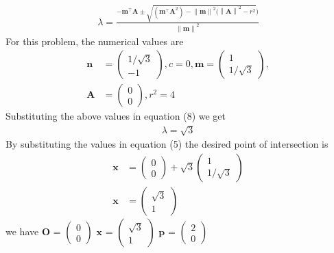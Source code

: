 \documentclass[10pt,a4paper]{report}
\providecommand{\norm}[1]{\left\lVert#1\right\rVert}
\newcommand{\myvec}[1]{\ensuremath{\begin{pmatrix}#1\end{pmatrix}}}
\let\vec\mathbf
\begin{document}
\begin{multicols}{2}
	  \begin{align}                                                                                      
		  \lambda = \frac{-\vec{m}^{\top}\vec{A}\pm \sqrt{({\vec{m}^{\top}\vec{A}}^2) -\norm{\vec{m}}^2({\norm{\vec{A}}}^2 - r^2 })}{\norm{\vec{m}}^2}                                                  
	  \end{align}                                                                                     
	  For this problem, the numerical values are                                                  
	  \begin{align}              
		  \vec{n} &= \myvec{1/\sqrt{3} \\ -1}, c = 0,
		  \vec{m} = \myvec{1 \\ 1/\sqrt{3}},                                      \\
                            \vec{A} &= \myvec{0 \\ 0},  r^2 = 4                                             
	  \end{align}                                                                                 
	  Substituting the above values in equation (8) we get                                                        
	  \begin{align}                                                                               
		  \lambda = \sqrt{3}
	  \end{align}
	  By substituting the values in equation (5)
the desired point of intersection is                                               
\begin{align}
	\vec{x} &= \myvec{0\\ 0} + \sqrt{3} \myvec{1 \\ 1/\sqrt{3}}        \\                        
	\vec{x} &= \myvec{\sqrt{3} \\ 1}                               
\end{align}
we have $\vec O$ = $\begin{pmatrix} 0 \\ 0 \end{pmatrix}$ 
	$\vec x$ = $\begin{pmatrix} \sqrt{3} \\ 1 \end{pmatrix}$ 
		$\vec p$ = $\begin{pmatrix} 2 \\ 0 \end{pmatrix}$ \\

\end{multicols}
\end{document}
